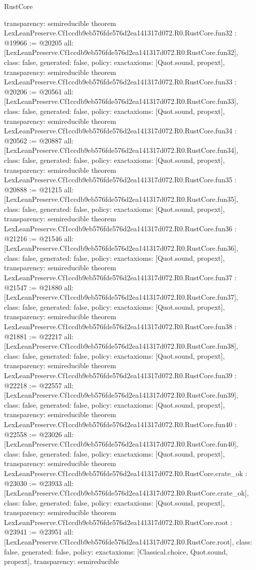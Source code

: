 \begin{lexlean}{RustCore}
\begin{coremodule}
{  transparency: semireducible
}
theorem LexLeanPreserve.Cf1ccdb9eb576fde576d2ea141317d072.R0.RustCore.fun32 : @19966 := @20205 {
  all: [LexLeanPreserve.Cf1ccdb9eb576fde576d2ea141317d072.R0.RustCore.fun32],
  class: false,
  generated: false,
  policy: exact{axioms: [Quot.sound, propext]},
  transparency: semireducible
}
theorem LexLeanPreserve.Cf1ccdb9eb576fde576d2ea141317d072.R0.RustCore.fun33 : @20206 := @20561 {
  all: [LexLeanPreserve.Cf1ccdb9eb576fde576d2ea141317d072.R0.RustCore.fun33],
  class: false,
  generated: false,
  policy: exact{axioms: [Quot.sound, propext]},
  transparency: semireducible
}
theorem LexLeanPreserve.Cf1ccdb9eb576fde576d2ea141317d072.R0.RustCore.fun34 : @20562 := @20887 {
  all: [LexLeanPreserve.Cf1ccdb9eb576fde576d2ea141317d072.R0.RustCore.fun34],
  class: false,
  generated: false,
  policy: exact{axioms: [Quot.sound, propext]},
  transparency: semireducible
}
theorem LexLeanPreserve.Cf1ccdb9eb576fde576d2ea141317d072.R0.RustCore.fun35 : @20888 := @21215 {
  all: [LexLeanPreserve.Cf1ccdb9eb576fde576d2ea141317d072.R0.RustCore.fun35],
  class: false,
  generated: false,
  policy: exact{axioms: [Quot.sound, propext]},
  transparency: semireducible
}
theorem LexLeanPreserve.Cf1ccdb9eb576fde576d2ea141317d072.R0.RustCore.fun36 : @21216 := @21546 {
  all: [LexLeanPreserve.Cf1ccdb9eb576fde576d2ea141317d072.R0.RustCore.fun36],
  class: false,
  generated: false,
  policy: exact{axioms: [Quot.sound, propext]},
  transparency: semireducible
}
theorem LexLeanPreserve.Cf1ccdb9eb576fde576d2ea141317d072.R0.RustCore.fun37 : @21547 := @21880 {
  all: [LexLeanPreserve.Cf1ccdb9eb576fde576d2ea141317d072.R0.RustCore.fun37],
  class: false,
  generated: false,
  policy: exact{axioms: [Quot.sound, propext]},
  transparency: semireducible
}
theorem LexLeanPreserve.Cf1ccdb9eb576fde576d2ea141317d072.R0.RustCore.fun38 : @21881 := @22217 {
  all: [LexLeanPreserve.Cf1ccdb9eb576fde576d2ea141317d072.R0.RustCore.fun38],
  class: false,
  generated: false,
  policy: exact{axioms: [Quot.sound, propext]},
  transparency: semireducible
}
theorem LexLeanPreserve.Cf1ccdb9eb576fde576d2ea141317d072.R0.RustCore.fun39 : @22218 := @22557 {
  all: [LexLeanPreserve.Cf1ccdb9eb576fde576d2ea141317d072.R0.RustCore.fun39],
  class: false,
  generated: false,
  policy: exact{axioms: [Quot.sound, propext]},
  transparency: semireducible
}
theorem LexLeanPreserve.Cf1ccdb9eb576fde576d2ea141317d072.R0.RustCore.fun40 : @22558 := @23026 {
  all: [LexLeanPreserve.Cf1ccdb9eb576fde576d2ea141317d072.R0.RustCore.fun40],
  class: false,
  generated: false,
  policy: exact{axioms: [Quot.sound, propext]},
  transparency: semireducible
}
theorem LexLeanPreserve.Cf1ccdb9eb576fde576d2ea141317d072.R0.RustCore.crate_ok : @23030 := @23933 {
  all: [LexLeanPreserve.Cf1ccdb9eb576fde576d2ea141317d072.R0.RustCore.crate_ok],
  class: false,
  generated: false,
  policy: exact{axioms: [Quot.sound, propext]},
  transparency: semireducible
}
theorem LexLeanPreserve.Cf1ccdb9eb576fde576d2ea141317d072.R0.RustCore.root : @23941 := @23951 {
  all: [LexLeanPreserve.Cf1ccdb9eb576fde576d2ea141317d072.R0.RustCore.root],
  class: false,
  generated: false,
  policy: exact{axioms: [Classical.choice, Quot.sound, propext]},
  transparency: semireducible
}


\end{coremodule}
\end{lexlean}
